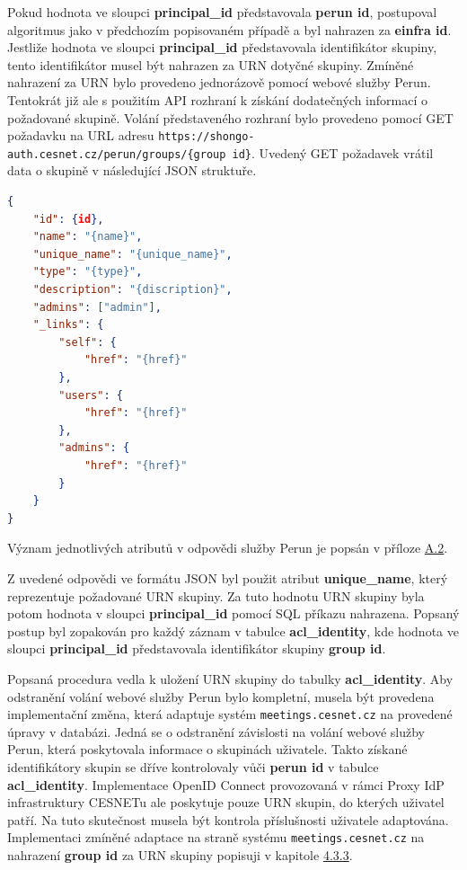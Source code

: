 \documentclass[
  printed, %
  twoside, %
  table,   %
  nolof,     %
  nolot,     %
]{fithesis3}
\begin{document}
\par 
Pokud hodnota ve sloupci \textbf{principal\_id} představovala \textbf{perun id}, postupoval algoritmus jako v předchozím popisovaném případě a byl nahrazen za \textbf{einfra id}. Jestliže hodnota ve sloupci \textbf{principal\_id} představovala identifikátor skupiny, tento identifikátor musel být nahrazen za URN  dotyčné skupiny. Zmíněné nahrazení za URN bylo provedeno jednorázově pomocí webové služby Perun. Tentokrát již ale s použitím API rozhraní k získání dodatečných informací o požadované skupině. Volání představeného rozhraní bylo provedeno pomocí GET požadavku na URL adresu  \texttt{https://shongo-auth.cesnet.cz/perun/groups/\{group id\}}. Uvedený GET požadavek vrátil data o skupině v následující JSON struktuře.   
\begin{lstlisting}[language=json,firstnumber=1]
{
    "id": {id},
    "name": "{name}",
    "unique_name": "{unique_name}",
    "type": "{type}",
    "description": "{discription}",
    "admins": ["admin"],
    "_links": {
        "self": {
            "href": "{href}"
        },
        "users": {
            "href": "{href}"
        },
        "admins": {
            "href": "{href}"
        }
    }
}
\end{lstlisting}
Význam jednotlivých atributů v odpovědi služby Perun je popsán v příloze \hyperref[table:perunws:group]{A.2}. 

\par

Z uvedené odpovědi ve formátu JSON byl použit atribut \textbf{unique\_name}, který reprezentuje požadované URN skupiny. Za tuto hodnotu URN skupiny byla potom hodnota v sloupci \textbf{principal\_id} pomocí SQL příkazu nahrazena. Popsaný postup byl zopakován pro každý záznam v tabulce \textbf{acl\_identity}, kde hodnota ve sloupci \textbf{principal\_id} představovala identifikátor skupiny \textbf{group id}. 
\par 

Popsaná procedura vedla k uložení URN skupiny do tabulky \textbf{acl\_identity}. Aby odstranění volání webové služby Perun bylo kompletní, musela být provedena implementační změna, která adaptuje systém \texttt{meetings.cesnet.cz} na provedené úpravy v databázi. Jedná se o odstranění závislosti na volání webové služby Perun, která poskytovala informace o skupinách uživatele. Takto získané identifikátory skupin se dříve kontrolovaly vůči \textbf{perun id} v tabulce \textbf{acl\_identity}. Implementace OpenID Connect provozovaná v rámci Proxy IdP infrastruktury CESNETu ale poskytuje pouze URN skupin, do kterých uživatel patří. Na tuto skutečnost musela být kontrola příslušnosti uživatele adaptována. Implementaci zmíněné adaptace na straně systému \texttt{meetings.cesnet.cz} na nahrazení \textbf{group id} za URN skupiny popisuji v kapitole \hyperref[ShongoImpl-web]{4.3.3}. 
\end{document}
